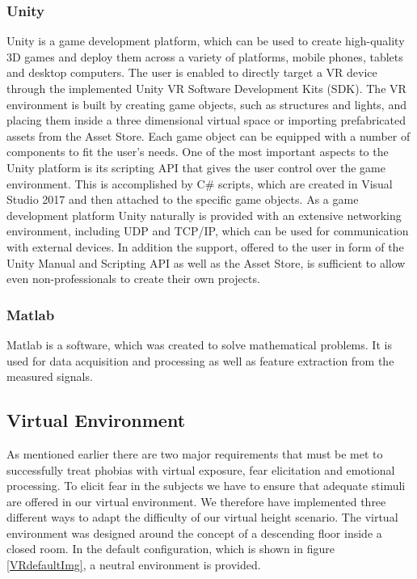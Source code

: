 \subsubsection{Unity}
Unity is a game development platform, which can be used to create high-quality 3D games and deploy them across a variety of platforms, mobile phones, tablets and desktop computers. The user is enabled to directly target a VR device through the implemented Unity VR Software Development Kits (SDK). The VR environment is built by creating game objects, such as structures and lights, and placing them inside a three dimensional virtual space or importing prefabricated assets from the Asset Store. Each game object can be equipped with a number of components to fit the user's needs. One of the most important aspects to the Unity platform is its scripting API that gives the user control over the game environment. This is accomplished by C\# scripts, which are created in Visual Studio 2017 and then attached to the  specific game objects. As a game development platform Unity naturally is provided with an extensive networking environment, including UDP and TCP/IP, which can be used for communication with external devices. In addition the support, offered to the user in form of the Unity Manual and Scripting API as well as the Asset Store, is sufficient to allow even non-professionals to create their own projects.

\subsubsection{Matlab}
Matlab is a software, which was created to solve mathematical problems. It is used for data acquisition and processing as well as feature extraction from the measured signals.

\subsection{Virtual Environment}
As mentioned earlier there are two major requirements that must be met to successfully treat phobias with virtual exposure, fear elicitation and emotional processing. To elicit fear in the subjects we have to ensure that adequate stimuli are offered in our virtual environment. We therefore have implemented three different ways to adapt the difficulty of our virtual height scenario. The virtual environment was designed around the concept of a descending floor inside a closed room. In the default configuration, which is shown in figure \ref{VRdefaultImg}, a neutral environment is provided.

